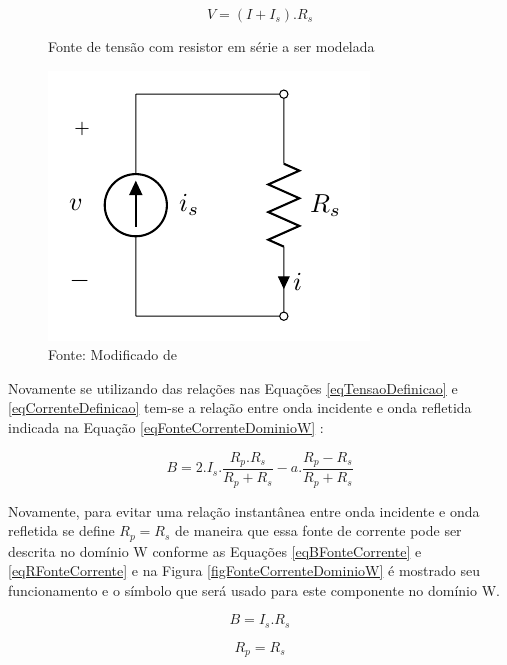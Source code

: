 	\begin{equation}
		\label{eqFonteCorrenteDominioK}
		V = (I + I_s).R_s
	\end{equation}
	
	\begin{figure}[h]
		\label{figFonteCorrenteModelada}
		\caption{Fonte de tensão com resistor em série a ser modelada}
		\includegraphics[scale=0.5]{images/fonteCorrenteModelada}
		\centering
		\caption*{Fonte: Modificado de \cite{Bogason2017}}
	\end{figure}
	
	Novamente se utilizando das relações nas Equações \ref{eqTensaoDefinicao} e \ref{eqCorrenteDefinicao} tem-se a relação entre onda incidente e onda refletida indicada na Equação \ref{eqFonteCorrenteDominioW} :
	
	\begin{equation}
		\label{eqFonteCorrenteDominioW}
		B = 2.I_s.\frac{R_p.R_s}{R_p+R_s}-a.\frac{R_p-R_s}{R_p+R_s}
	\end{equation}
	
	Novamente, para evitar uma relação instantânea entre onda incidente e onda refletida se define $R_p = R_s$ de maneira que essa fonte de corrente pode ser descrita no domínio W conforme as Equações \ref{eqBFonteCorrente} e \ref{eqRFonteCorrente} e na Figura \ref{figFonteCorrenteDominioW} é mostrado seu funcionamento e o símbolo que será usado para este componente no domínio W.
	
	\begin{equation}
		\label{eqBFonteCorrente}
		B = I_s.R_s
	\end{equation}
	
	\begin{equation}
		\label{eqRFonteCorrente}
		R_p = R_s
	\end{equation}
	
